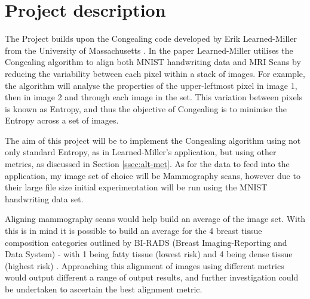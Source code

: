 \documentclass[11pt,fleqn,twoside]{article}
\begin{document}
\wordcount{}

\mmp

\setcounter{tocdepth}{3} %


\section{Project description}

The Project builds upon the Congealing code developed by Erik Learned-Miller from the University of Massachusetts \cite{joint-alignment}. In the paper Learned-Miller utilises the Congealing algorithm to align both MNIST handwriting data and MRI Scans by reducing the variability between each pixel within a stack of images. For example, the algorithm will analyse the properties of the upper-leftmost pixel in image 1, then in image 2 and through each image in the set. This variation between pixels is known as Entropy, and thus the objective of Congealing is to minimise the Entropy across a set of images.

The aim of this project will be to implement the Congealing algorithm using not only standard Entropy, as in Learned-Miller's application, but using other metrics, as discussed in Section \ref{ssec:alt-met}. As for the data to feed into the application, my image set of choice will be Mammography scans, however due to their large file size initial experimentation will be run using the MNIST handwriting data set.

Aligning mammography scans would help build an average of the image set. With this is in mind it is possible to build an average for the 4 breast tissue composition categories outlined by BI-RADS (Breast Imaging-Reporting and Data System) - with 1 being fatty tissue (lowest risk) and 4 being dense tissue (highest risk) \cite{bi-rads}. Approaching this alignment of images using different metrics would output different a range of output results, and further investigation could be undertaken to ascertain the best alignment metric.
\end{document}
